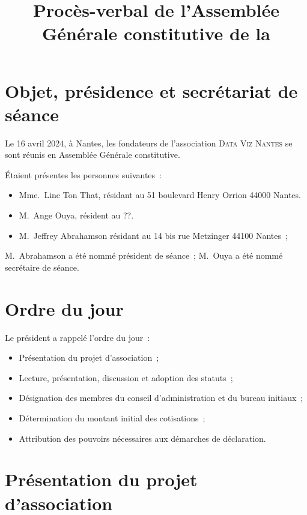 \documentclass[12pt]{article}
\title{Procès-verbal de l'Assemblée Générale constitutive de la \Nom}
\date{}
\newcommand{\quand}{16 avril 2024}
\newcommand{\Nom}{\textsc{Data Viz Nantes}}
\begin{document}
\maketitle

\section{Objet, présidence et secrétariat de séance}
\label{sec:objet}

Le \quand, à Nantes, les fondateurs de l'association \Nom{} se
sont réunis en Assemblée Générale constitutive.

Étaient présentes les personnes suivantes :

\begin{itemize}
\item Mme.~Line Ton That, résidant au 51 boulevard Henry Orrion 44000 Nantes.
\item M.~Ange Ouya, résident au ??.
\item M.~Jeffrey Abrahamson résidant au 14 bis rue Metzinger 44100
  Nantes ;
\end{itemize}

M.~Abrahamson a été nommé président de séance ; M.~Ouya a été nommé
secrétaire de séance.

\section{Ordre du jour}
\label{sec:ordre-du-jour}

Le président a rappelé l'ordre du jour :

\begin{itemize}
\item Présentation du projet d'association ;
\item Lecture, présentation, discussion et adoption des statuts ;
\item Désignation des membres du conseil d'administration et du bureau
  initiaux ;
\item Détermination du montant initial des cotisations ;
\item Attribution des pouvoirs nécessaires aux démarches de déclaration.
\end{itemize}

\section{Présentation du projet d'association}
\label{sec:presentation-du-projet-d-association}
\end{document}
